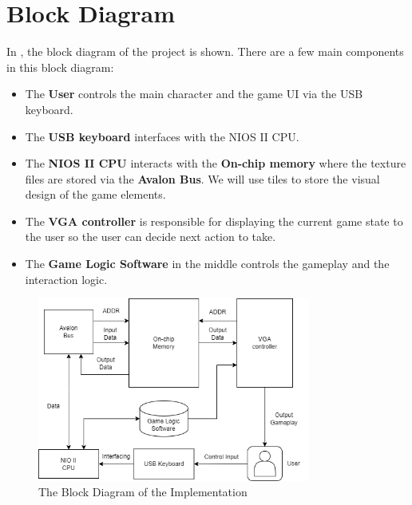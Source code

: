 \documentclass{article}
\begin{document}
\section{Block Diagram}
In , the block diagram of the project is shown. There are a few main components in this block diagram:
\begin{itemize}
    \item The \textbf{User} controls the main character and the game UI via the USB keyboard.
    \item The \textbf{USB keyboard} interfaces with the NIOS II CPU.
    \item The \textbf{NIOS II CPU} interacts with the \textbf{On-chip memory} where the texture files are stored via the \textbf{Avalon Bus}. We will use tiles to store the visual design of the game elements.
    \item The \textbf{VGA controller} is responsible for displaying the current game state to the user so the user can decide next action to take.
    \item The \textbf{Game Logic Software} in the middle controls the gameplay and the interaction logic. 
\end{itemize}

\begin{figure}[h]
    \centering
    \includegraphics[width=0.8\textwidth]{block_diagram.png}
    \caption{The Block Diagram of the Implementation}
    \label{fig:block_diagram}
\end{figure}
\end{document}
